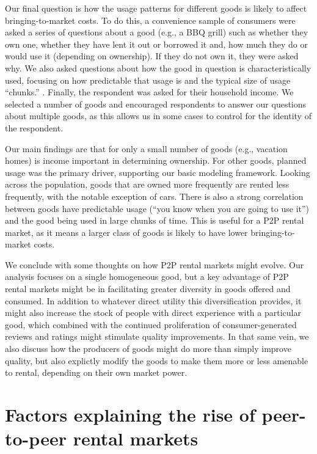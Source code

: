 \documentclass[11pt]{article}
\begin{document}
Our final question is how the usage patterns for different goods is likely to affect bringing-to-market costs.
To do this, a convenience sample of consumers were asked a series of questions about a good (e.g., a BBQ grill) such as whether they own one, whether they have lent it out or borrowed it and, how much they do or would use it (depending on ownership). 
If they do not own it, they were asked why. 
We also asked questions about how the good in question is characteristically used, focusing on how predictable that usage is and the typical size of usage ``chunks.'' . 
Finally, the respondent was asked for their household income.  
We selected a number of goods and encouraged respondents to answer our questions about multiple goods, as this allows us in some cases to control for the identity of the respondent. 

Our main findings are that for only a small number of goods (e.g., vacation homes) is income important in determining ownership. 
For other goods, planned usage was the primary driver, supporting our basic modeling framework.  
Looking across the population, goods that are owned more frequently are rented less frequently, with the notable exception of cars.
There is also a strong correlation between goods have predictable usage (``you know when you are going to use it'') and the good being used in large chunks of time.
This is useful for a P2P rental market, as it means a larger class of goods is likely to have lower bringing-to-market costs.  

We conclude with some thoughts on how P2P rental markets might evolve.
Our analysis focuses on a single homogeneous good, but a key advantage of P2P rental markets might be in facilitating greater diversity in goods offered and consumed. 
In addition to whatever direct utility this diversification provides, it might also increase the stock of people with direct experience with a particular good, which combined with the continued proliferation of consumer-generated reviews and ratings might stimulate quality improvements. 
In that same vein, we also discuss how the producers of goods might do more than simply improve quality, but also explictly modify the goods to make them more or less amenable to rental, depending on their own market power. 
 
\section{Factors explaining the rise of peer-to-peer rental markets}
\end{document}
